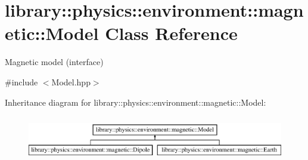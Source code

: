 \hypertarget{classlibrary_1_1physics_1_1environment_1_1magnetic_1_1_model}{}\section{library\+:\+:physics\+:\+:environment\+:\+:magnetic\+:\+:Model Class Reference}
\label{classlibrary_1_1physics_1_1environment_1_1magnetic_1_1_model}


Magnetic model (interface)  




{\ttfamily \#include $<$Model.\+hpp$>$}

Inheritance diagram for library\+:\+:physics\+:\+:environment\+:\+:magnetic\+:\+:Model\+:\begin{figure}[H]
\begin{center}
\leavevmode
\includegraphics[height=2.000000cm]{classlibrary_1_1physics_1_1environment_1_1magnetic_1_1_model}
\end{center}
\end{figure}
